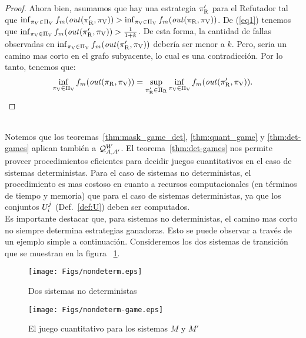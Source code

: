\begin{proof}
Ahora bien, asumamos que hay una estrategia $\pi_{\mathrm{R}}'$ para el Refutador tal que 
$\inf_{\pi_V \in \Pi_V} f_m (\mathit{out}(\pi_{\mathrm{R}}', \pi_{\mathrm{V}})) > \inf_{\pi_{\mathrm{V}} \in \Pi_{\mathrm{V}}} f_m (\mathit{out}(\pi_{\mathrm{R}}, \pi_{\mathrm{V}}))$.
De (\ref{eq1}) tenemos que $\inf_{\pi_{\mathrm{V}} \in \Pi_{\mathrm{V}}} f_m(\mathit{out}(\pi_{\mathrm{R}}', \pi_{\mathrm{V}})) > \frac{1}{1+k}$. 
De esta forma, la cantidad de fallas observadas en 
$\inf_{\pi_{\mathrm{V}} \in \Pi_{\mathrm{V}}} f_m(\mathit{out}(\pi_{\mathrm{R}}', \pi_{\mathrm{V}}))$ debería ser menor a $k$. 
Pero, seria un camino mas corto en el grafo subyacente, lo cual es una contradicción. Por lo tanto, tenemos que:
\[	
	\inf_{\pi_{\mathrm{V}} \in \Pi_{\mathrm{V}}} f_m(\mathit{out}(\pi_{\mathrm{R}}, \pi_{\mathrm{V}})) = \sup_{\pi_{\mathrm{R}}' \in \Pi_{\mathrm{R}}} \inf_{\pi_{\mathrm{V}} \in \Pi_{\mathrm{V}}} f_m( \mathit{out}(\pi_{\mathrm{R}}',\pi_{\mathrm{V}})).
\]	
\qedhere
\end{proof} \\

	Notemos que los teoremas~\ref{thm:mask_game_det}, \ref{thm:quant_game} y \ref{thm:det-games} aplican también a 
$\mathcal{Q}^W_{A,A'}$.
	El teorema~\ref{thm:det-games} nos permite proveer procedimientos eficientes para decidir juegos cuantitativos en el caso de sistemas deterministas. Para el caso de sistemas no deterministas, el procedimiento es mas costoso en cuanto a recursos computacionales (en términos de tiempo y memoria) que para el caso de sistemas deterministas, ya que los conjuntos $U^j_i$ (Def.~\ref{def:U}) deben ser computados. \\

Es importante destacar que, para sistemas no deterministas, el camino mas corto no siempre determina estrategias ganadoras. Esto se puede observar a través de un ejemplo simple a continuación. Consideremos los dos sistemas de transición que se muestran en la figura ~\ref{fig:two-nondet-systems}.

\begin{figure} [h]
\begin{center}
    \texttt{[image: Figs/nondeterm.eps]} 
    \caption{Dos sistemas no deterministas}
    \label{figure:nondeterm}\label{fig:two-nondet-systems}
\end{center}
\end{figure}
\begin{figure} [h]
\begin{center}
    \texttt{[image: Figs/nondeterm-game.eps]} 
    \caption{El juego cuantitativo para los sistemas $M$ y $M'$}
    \label{figure:nondeterm-game}
\end{center}
\end{figure}

